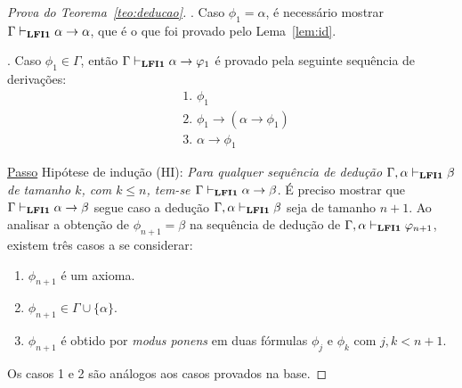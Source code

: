 \begin{proof}[Prova do Teorema~\ref{teo:deducao}]
        . Caso $\phi_{1} = \alpha$, é necessário mostrar $\Gamma \vdash_{\textbf{LFI1}{}} \alpha \to \alpha$, que é o que foi provado pelo Lema~\ref{lem:id}.

        . Caso $\phi_{1} \in \Gamma$, então $\Gamma \vdash_{\textbf{LFI1}{}} \alpha \to \varphi_{1}$ é provado pela seguinte sequência de derivações:
        \begin{align*}
            & \text{1. } \phi_{1} \tag{Premissa}\\
            & \text{2. } \phi_{1} \to (\alpha \to \phi_{1}) \tag{Ax1}\\
            & \text{3. } \alpha \to \phi_{1} \tag{MP 1, 2}
        \end{align*}

        \noindent \underline{Passo} Hipótese de indução (HI): \textit{Para qualquer sequência de dedução $\Gamma, \alpha \vdash_{\textbf{LFI1}{}} \beta$ de tamanho $k$, com $k \leq n$, tem-se $\Gamma \vdash_{\textbf{LFI1}{}} \alpha \to \beta$}. É preciso mostrar que $\Gamma \vdash_{\textbf{LFI1}{}} \alpha \to \beta$ segue caso a dedução $\Gamma, \alpha \vdash_{\textbf{LFI1}{}} \beta$ seja de tamanho $n + 1$. Ao analisar a obtenção de $\phi_{n + 1} = \beta$ na sequência de dedução de $\Gamma, \alpha\vdash_{\textbf{LFI1}{}} \varphi_{n + 1}$, existem três casos a se considerar:
        \begin{enumerate}
            \item $\phi_{n + 1}$ é um axioma.
            \item $\phi_{n + 1} \in \Gamma \cup \{\alpha\}$.
            \item $\phi_{n + 1}$ é obtido por \textit{modus ponens} em duas fórmulas $\phi_{j}$ e $\phi_{k}$ com $j, k < n + 1$.
        \end{enumerate}
        
        \noindent Os casos 1 e 2 são análogos aos casos provados na base.


\end{proof}

